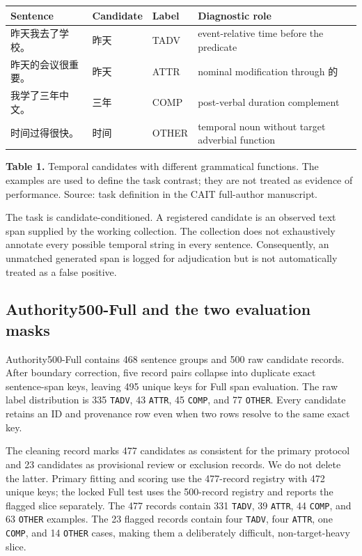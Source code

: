 \documentclass{CUP-JNL-NLP}
\begin{document}
\begin{table}[htbp]\centering\small\begin{tabularx}{\linewidth}{lXXX}\toprule
Sentence & Candidate & Label & Diagnostic role \\ \midrule
昨天我去了学校。 & 昨天 & TADV & event-relative time before the predicate \\
昨天的会议很重要。 & 昨天 & ATTR & nominal modification through 的 \\
我学了三年中文。 & 三年 & COMP & post-verbal duration complement \\
时间过得很快。 & 时间 & OTHER & temporal noun without target adverbial function \\
\bottomrule\end{tabularx}\end{table}
\textbf{Table 1.} Temporal candidates with different grammatical functions. The examples are used to define the task contrast; they are not treated as evidence of performance. Source: task definition in the CAIT full-author manuscript.

The task is candidate-conditioned. A registered candidate is an observed text span supplied by the working collection. The collection does not exhaustively annotate every possible temporal string in every sentence. Consequently, an unmatched generated span is logged for adjudication but is not automatically treated as a false positive.

\subsection{Authority500-Full and the two evaluation masks}
Authority500-Full contains 468 sentence groups and 500 raw candidate records. After boundary correction, five record pairs collapse into duplicate exact sentence-span keys, leaving 495 unique keys for Full span evaluation. The raw label distribution is 335 \texttt{TADV}, 43 \texttt{ATTR}, 45 \texttt{COMP}, and 77 \texttt{OTHER}. Every candidate retains an ID and provenance row even when two rows resolve to the same exact key.

The cleaning record marks 477 candidates as consistent for the primary protocol and 23 candidates as provisional review or exclusion records. We do not delete the latter. Primary fitting and scoring use the 477-record registry with 472 unique keys; the locked Full test uses the 500-record registry and reports the flagged slice separately. The 477 records contain 331 \texttt{TADV}, 39 \texttt{ATTR}, 44 \texttt{COMP}, and 63 \texttt{OTHER} examples. The 23 flagged records contain four \texttt{TADV}, four \texttt{ATTR}, one \texttt{COMP}, and 14 \texttt{OTHER} cases, making them a deliberately difficult, non-target-heavy slice.
\end{document}
